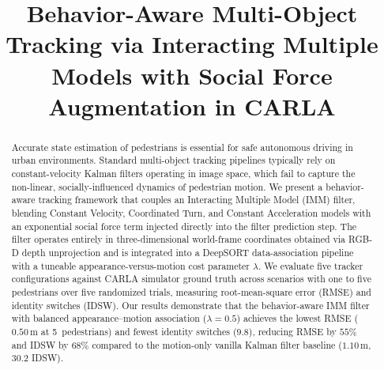 \documentclass[conference]{IEEEtran}
\begin{document}
\title{Behavior-Aware Multi-Object Tracking via Interacting Multiple Models with Social Force Augmentation in CARLA}

\author{
\and
{}
\and
{}
}

\maketitle

\begin{abstract}
Accurate state estimation of pedestrians is essential for safe autonomous driving in urban environments. Standard multi-object tracking pipelines typically rely on constant-velocity Kalman filters operating in image space, which fail to capture the non-linear, socially-influenced dynamics of pedestrian motion. We present a behavior-aware tracking framework that couples an Interacting Multiple Model (IMM) filter, blending Constant Velocity, Coordinated Turn, and Constant Acceleration models with an exponential social force term injected directly into the filter prediction step. The filter operates entirely in three-dimensional world-frame coordinates obtained via RGB-D depth unprojection and is integrated into a DeepSORT data-association pipeline with a tuneable appearance-versus-motion cost parameter $\lambda$. We evaluate five tracker configurations against CARLA simulator ground truth across scenarios with one to five pedestrians over five randomized trials, measuring root-mean-square error (RMSE) and identity switches (IDSW). Our results demonstrate that the behavior-aware IMM filter with balanced appearance--motion association ($\lambda{=}0.5$) achieves the lowest RMSE ($0.50\,\text{m}$ at 5~pedestrians) and fewest identity switches ($9.8$), reducing RMSE by $55\%$ and IDSW by $68\%$ compared to the motion-only vanilla Kalman filter baseline ($1.10\,\text{m}$, $30.2$ IDSW).
\end{abstract}
\end{document}
